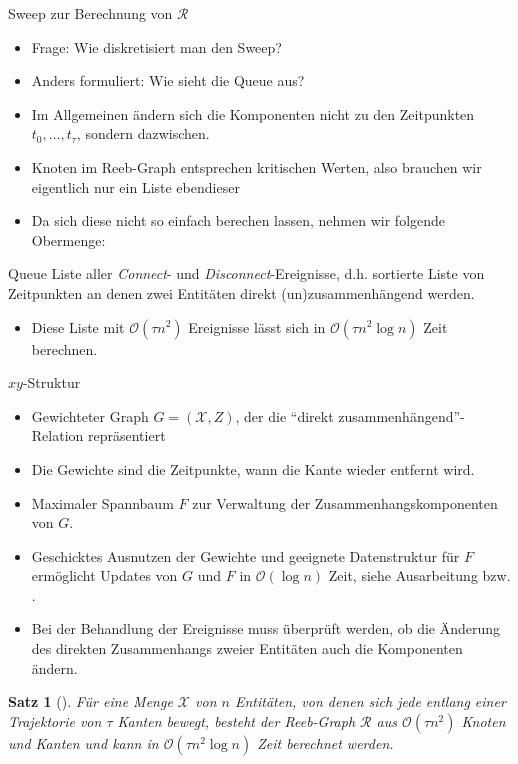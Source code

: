 \documentclass[
wide,
10pt,
xcolor={x11names,svgnames},
hyperref={pdfauthor={Jannes Bantje},colorlinks,urlcolor=maincolor,hidelinks=false,linkcolor=maincolor},
pantone312, 	%
euler-digits,
]{beamer}
\newtheorem{satz}{Satz}
\theoremstyle{definition}
\begin{document}
\begin{frame}{Sweep zur Berechnung von $\mathcal{R}$}
    \begin{itemize}
        \item Frage: Wie diskretisiert man den Sweep?
        \item Anders formuliert: Wie sieht die Queue aus?
        \item Im Allgemeinen ändern sich die Komponenten nicht zu den Zeitpunkten $t_0, \ldots, t_\tau$, sondern dazwischen.
        \item Knoten im Reeb-Graph entsprechen kritischen Werten, also brauchen wir eigentlich nur ein Liste ebendieser
        \item Da sich diese nicht so einfach berechen lassen, nehmen wir folgende Obermenge:
    \end{itemize}
    \begin{block}{Queue}
        Liste aller \emph{Connect}- und \emph{Disconnect}-Ereignisse, d.h. sortierte Liste von Zeitpunkten an denen zwei Entitäten direkt (un)zusammenhängend werden.
    \end{block}
    \begin{itemize}
        \item Diese Liste mit $\mathcal{O}(\tau n^2)$ Ereignisse lässt sich in $\mathcal{O}(\tau n^2 \log n)$ Zeit berechnen.
    \end{itemize}
\end{frame}

\begin{frame}%
    \begin{block}{$xy$-Struktur}
        \begin{itemize}
            \item Gewichteter Graph $G=(\mathcal{X},Z)$, der die \enquote{direkt zusammenhängend}-Relation repräsentiert
            \item Die Gewichte sind die Zeitpunkte, wann die Kante wieder entfernt wird.
            \item Maximaler Spannbaum $F$ zur Verwaltung der Zusammenhangskomponenten von $G$.
        \end{itemize}
    \end{block}
    \begin{itemize}
        \item Geschicktes Ausnutzen der Gewichte und geeignete Datenstruktur für $F$ ermöglicht Updates von $G$ und $F$ in $\mathcal{O}(\log n)$ Zeit, siehe Ausarbeitung bzw. \cites{buchin2015}{parsaReeb}.
        \item Bei der Behandlung der Ereignisse muss überprüft werden, ob die Änderung des direkten Zusammenhangs zweier Entitäten auch die Komponenten ändern.
    \end{itemize}
    \begin{satz}[{\cite[Thm.~7]{buchin2015}}]
    	Für eine Menge $\mathcal{X}$ von $n$ Entitäten, von denen sich jede entlang einer Trajektorie von $\tau$ Kanten bewegt, besteht der Reeb-Graph $\mathcal{R}$ aus $\mathcal{O}(\tau n^2)$ Knoten und Kanten und kann in $\mathcal{O}(\tau n^2 \log n)$ Zeit berechnet werden.
    \end{satz}
\end{frame}
\end{document}
